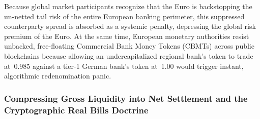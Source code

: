 \documentclass[a4paper,11pt,twoside,parskip=half-,headings=small]{scrartcl}
\newcommand{\EUR}[1]{\texteuro\,#1}
\begin{document}
Because global market participants recognize that the Euro is backstopping the un-netted tail risk of the entire European banking perimeter, this suppressed counterparty spread is absorbed as a systemic penalty, depressing the global risk premium of the Euro. At the same time, European monetary authorities resist unbacked, free-floating Commercial Bank Money Tokens (CBMTs) across public blockchains because allowing an undercapitalized regional bank's token to trade at \EUR{0.985} against a tier-1 German bank's token at \EUR{1.00} would trigger instant, algorithmic redenomination panic.

\subsubsection{Compressing Gross Liquidity into Net Settlement and the Cryptographic Real Bills Doctrine}
\label{sec:cryptographic_real_bills}
\end{document}
